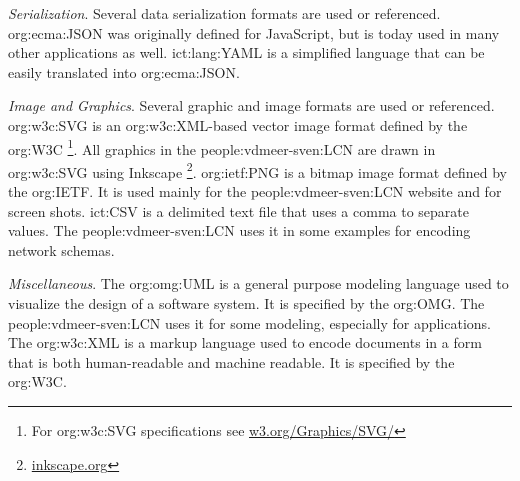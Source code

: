 \textit{Serialization}.
Several data serialization formats are used or referenced.
    \ac{org:ecma:JSON} was originally defined for JavaScript, but is today used in many other applications as well.
    \ac{ict:lang:YAML} is a simplified language that can be easily translated into \ac{org:ecma:JSON}.

\textit{Image and Graphics}.
Several graphic and image formats are used or referenced.
    \ac{org:w3c:SVG} is an \acs{org:w3c:XML}-based vector image format defined by the \acs{org:W3C} \footnote{For \acs{org:w3c:SVG} specifications see \href{https://www.w3.org/Graphics/SVG/}{w3.org/Graphics/SVG/}}.
        All graphics in the \ac{people:vdmeer-sven:LCN} are drawn in \ac{org:w3c:SVG} using Inkscape \footnote{\href{https://inkscape.org/}{inkscape.org}}.
    \ac{org:ietf:PNG} is a bitmap image format defined by the \acs{org:IETF}.
        It is used mainly for the \ac{people:vdmeer-sven:LCN} website and for screen shots.
    \ac{ict:CSV} is a delimited text file that uses a comma to separate values.
        The \ac{people:vdmeer-sven:LCN} uses it in some examples for encoding network schemas.

\textit{Miscellaneous}.
    The \ac{org:omg:UML} is a general purpose modeling language used to visualize the design of a software system.
        It is specified by the \acs{org:OMG}.
        The \ac{people:vdmeer-sven:LCN} uses it for some modeling, especially for applications.
    The \ac{org:w3c:XML} is a markup language used to encode documents in a form that is both human-readable and machine readable.
        It is specified by the \acs{org:W3C}.
